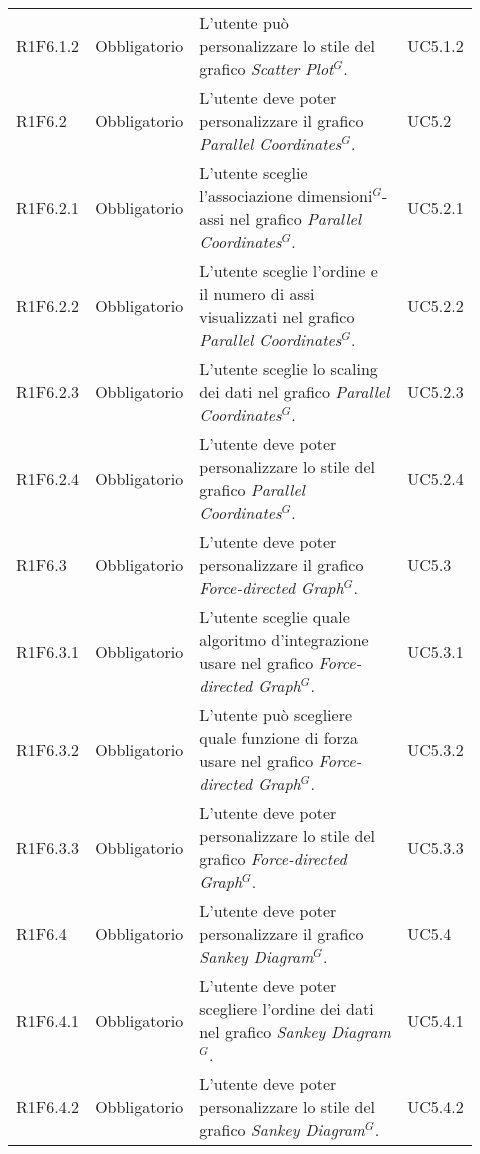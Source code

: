 {\begin{longtable}{p{0.12\linewidth}p{0.15\linewidth}p{0.50\linewidth}p{0.15\linewidth}}
    \rowcolor[RGB]{216, 235, 171}
    R1F6.1.2 & Obbligatorio & L'utente può personalizzare lo stile del grafico \textit{Scatter Plot$^{G}$}. & UC5.1.2\\
    \rowcolor[RGB]{233, 245, 206}
    R1F6.2 & Obbligatorio & L'utente deve poter personalizzare il grafico \textit{Parallel Coordinates$^{G}$}. & UC5.2\\
    \rowcolor[RGB]{216, 235, 171}
    R1F6.2.1 & Obbligatorio & L'utente sceglie l'associazione dimensioni$^{G}$-assi nel grafico \textit{Parallel Coordinates$^{G}$}. & UC5.2.1\\
    \rowcolor[RGB]{233, 245, 206}
    R1F6.2.2 & Obbligatorio & L'utente sceglie l'ordine e il numero di assi visualizzati nel grafico \textit{Parallel Coordinates$^{G}$}. & UC5.2.2\\
    \rowcolor[RGB]{216, 235, 171}
    R1F6.2.3 & Obbligatorio & L'utente sceglie lo scaling dei dati nel grafico \textit{Parallel Coordinates$^{G}$}. & UC5.2.3\\
    \rowcolor[RGB]{233, 245, 206}
    R1F6.2.4 & Obbligatorio & L'utente deve poter personalizzare lo stile del grafico \textit{Parallel Coordinates$^{G}$}. & UC5.2.4\\
    \rowcolor[RGB]{216, 235, 171}
    R1F6.3 & Obbligatorio & L'utente deve poter personalizzare il grafico \textit{Force-directed Graph$^{G}$}. & UC5.3\\
    \rowcolor[RGB]{233, 245, 206}
    R1F6.3.1 & Obbligatorio & L'utente sceglie quale algoritmo d'integrazione usare nel grafico \textit{Force-directed Graph$^{G}$}. & UC5.3.1\\
    \rowcolor[RGB]{216, 235, 171}
    R1F6.3.2 & Obbligatorio & L'utente può scegliere quale funzione di forza usare nel grafico \textit{Force-directed Graph$^{G}$}. & UC5.3.2\\
    \rowcolor[RGB]{233, 245, 206}
    R1F6.3.3 & Obbligatorio & L'utente deve poter personalizzare lo stile del grafico \textit{Force-directed Graph$^{G}$}. & UC5.3.3\\
    \rowcolor[RGB]{216, 235, 171}
    R1F6.4 & Obbligatorio & L'utente deve poter personalizzare il grafico \textit{Sankey Diagram$^{G}$}. & UC5.4\\
    \rowcolor[RGB]{233, 245, 206}
    R1F6.4.1 & Obbligatorio & L'utente deve poter scegliere l'ordine dei dati nel grafico \textit{Sankey Diagram$^{G}$}. & UC5.4.1\\
    \rowcolor[RGB]{216, 235, 171}
    R1F6.4.2 & Obbligatorio & L'utente deve poter personalizzare lo stile del grafico \textit{Sankey Diagram$^{G}$}. & UC5.4.2\\


\end{longtable}}
